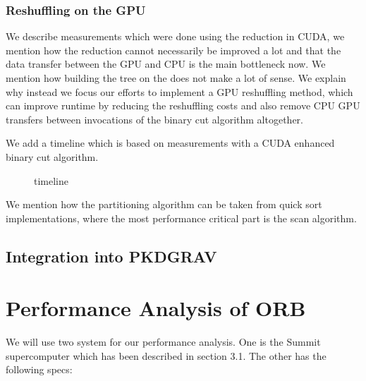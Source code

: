 \documentclass[]{article}
\begin{document}
\subsubsection{Reshuffling on the GPU}

We describe measurements which were done using the reduction in CUDA, we mention how the reduction cannot necessarily be improved a lot and that the data transfer between the GPU and CPU is the main bottleneck now. We mention how building the tree on the does not make a lot of sense. We explain why instead we focus our efforts to implement a GPU reshuffling method, which can improve runtime by reducing the reshuffling costs and also remove CPU GPU transfers between invocations of the binary cut algorithm altogether. 

We add a timeline which is based on measurements with a CUDA enhanced binary cut algorithm. 
\begin{figure}[H]
	\begin{center}
	\end{center}
	\caption{timeline}
	\label{u}
\end{figure}

We mention how the partitioning algorithm can be taken from quick sort implementations, where the most performance critical part is the scan algorithm. 
\newpage
\subsection{Integration into PKDGRAV}



\newpage
\section{Performance Analysis of ORB}

We will use two system for our performance analysis. One is the Summit supercomputer which has been described in section 3.1. The other has the following specs:
\end{document}
